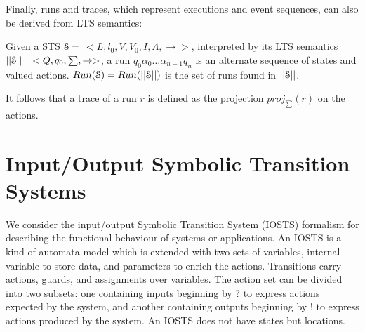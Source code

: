 Finally, runs and traces, which represent executions and event
sequences, can also be derived from LTS semantics:

\begin{definition}
    Given a STS $\EuScript{S}=$ $<L,l_0,V,V_0,I,\Lambda,
	\rightarrow>$, interpreted by its LTS semantics
	$||\EuScript{S}||=<Q,q_0,\sum,\rightarrow>$, a run $q_0
	\alpha_0 \dots \alpha_{n-1} q_n$ is an alternate sequence of states
    and valued actions. $Run(\EuScript{S})=Run(||\EuScript{S}||)$ is
	the set of runs found in $||\EuScript{S}||$.

    It follows that a trace of a run $r$ is defined as the projection
    $proj_{\sum}(r)$ on the actions.

	\label{def:runs-and-traces}
\end{definition}


\section{Input/Output Symbolic Transition Systems}
\label{sec:definitions:iosts}

We consider the input/output Symbolic Transition System (IOSTS)
formalism \cite{FTW05} for describing the functional behaviour of
systems or applications. An IOSTS is a kind of automata model
which is extended with two sets of variables, internal variable
to store data, and parameters to enrich the actions. Transitions
carry actions, guards, and assignments over variables. The action
set can be divided into two subsets: one containing inputs
beginning by $?$ to express actions expected by the system, and
another containing outputs beginning by $!$ to express actions
produced by the system. An IOSTS does not have states but
locations.


